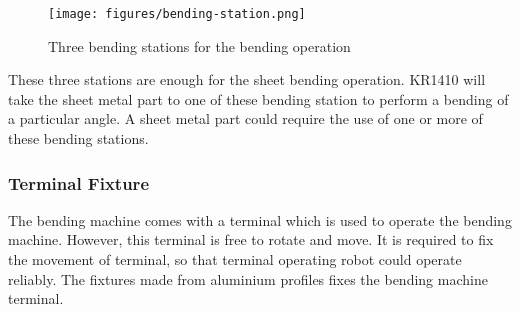 \begin{figure}[h]
    \centering
    \texttt{[image: figures/bending-station.png]}
    \caption{Three bending stations for the bending operation}
    \label{fig:bending-station}
\end{figure}

These three stations are enough for the sheet bending operation. KR1410 will take the sheet metal part to one of these bending station
to perform a bending of a particular angle. A sheet metal part could require the use of one or more of these bending stations.

\subsubsection{Terminal Fixture}
The bending machine comes with a terminal which is used to operate the bending machine. However, this terminal is free to rotate and move.
It is required to fix the movement of terminal, so that terminal operating robot could operate reliably. The fixtures made from aluminium profiles fixes the bending machine
terminal.

